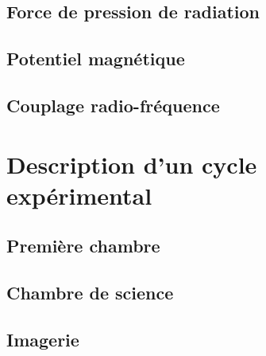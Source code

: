 \subsection{Force de pression de radiation}
\subsection{Potentiel magnétique}
\subsection{Couplage radio-fréquence} 

\section{Description d'un cycle expérimental}
\subsection{Première chambre}
\subsection{Chambre de science}
\subsection{Imagerie}




